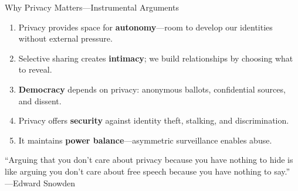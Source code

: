﻿\documentclass[aspectratio=169,11pt]{beamer}
\begin{document}
\begin{frame}{Why Privacy Matters---Instrumental Arguments}
\begin{probox}
\scriptsize
\begin{enumerate}
    \item Privacy provides space for \textbf{autonomy}---room to develop our identities without external pressure.
    \item Selective sharing creates \textbf{intimacy}; we build relationships by choosing what to reveal.
    \item \textbf{Democracy} depends on privacy: anonymous ballots, confidential sources, and dissent.
    \item Privacy offers \textbf{security} against identity theft, stalking, and discrimination.
    \item It maintains \textbf{power balance}---asymmetric surveillance enables abuse.
\end{enumerate}
\end{probox}

\begin{quotebox}
\small
``Arguing that you don't care about privacy because you have nothing to hide is like arguing you don't care about free speech because you have nothing to say.'' \hfill---Edward Snowden
\end{quotebox}
\end{frame}
\end{document}
